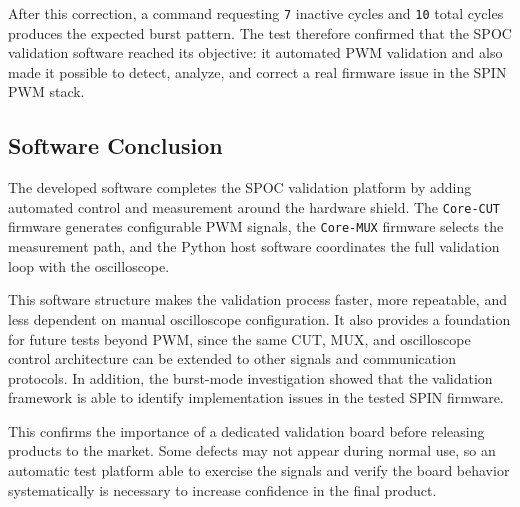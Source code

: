 After this correction, a command requesting \texttt{7} inactive cycles
and \texttt{10} total cycles produces the expected burst pattern. The
test therefore confirmed that the SPOC validation software reached its
objective: it automated PWM validation and also made it possible to
detect, analyze, and correct a real firmware issue in the SPIN PWM
stack.

\subsection{Software Conclusion}
\label{software-conclusion}

The developed software completes the SPOC validation platform by adding
automated control and measurement around the hardware shield. The
\texttt{Core-CUT} firmware generates configurable PWM signals, the
\texttt{Core-MUX} firmware selects the measurement path, and the Python
host software coordinates the full validation loop with the oscilloscope.

This software structure makes the validation process faster, more
repeatable, and less dependent on manual oscilloscope configuration. It
also provides a foundation for future tests beyond PWM, since the same
CUT, MUX, and oscilloscope control architecture can be extended to other
signals and communication protocols. In addition, the
burst-mode investigation showed that the validation framework is able to
identify implementation issues in the tested SPIN firmware.

This confirms the importance of a dedicated validation board before
releasing products to the market. Some defects may not appear during
normal use, so an automatic test platform able to exercise the signals
and verify the board behavior systematically is necessary to increase
confidence in the final product.


\FloatBarrier

